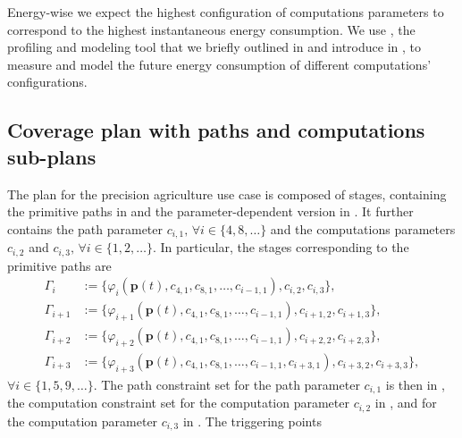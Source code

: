 Energy-wise we expect the highest configuration of computations parameters to correspond to the highest instantaneous energy consumption. We use \powprof{}, the profiling and modeling tool that we briefly outlined in  and introduce in , to measure and model the future energy consumption of different computations' configurations.

\subsection{Coverage plan with paths and computations sub-plans}

The plan for the precision agriculture use case is composed of stages, containing the primitive paths in  and the parameter-dependent version in . It further contains the path parameter $c_{i,1},\,\forall i\in\{4,8,\dots\}$ and the computations parameters $c_{i,2}$ and $c_{i,3},\,\forall i\in\{1,2,\dots\}$. In particular, the stages corresponding to the primitive paths are 
\begin{subequations}\label{eq:ex-pb-stages}\begin{align}
  \Gamma_i&:=\{\varphi_i(\mathbf{p}(t),c_{4,1},c_{8,1},\dots,c_{i-1,1}),c_{i,2},c_{i,3}\},\label{eq:line-plan}\\
  \Gamma_{i+1}&:=\{\varphi_{i+1}(\mathbf{p}(t),c_{4,1},c_{8,1},\dots,c_{i-1,1}),c_{i+1,2},c_{i+1,3}\},\label{eq:circ-plan}\\
  \Gamma_{i+2}&:=\{\varphi_{i+2}(\mathbf{p}(t),c_{4,1},c_{8,1},\dots,c_{i-1,1}),c_{i+2,2},c_{i+2,3}\},\label{eq:line2-plan}\\
  \Gamma_{i+3}&:=\{\varphi_{i+3}(\mathbf{p}(t),c_{4,1},c_{8,1},\dots,c_{i-1,1},c_{i+3,1}),c_{i+3,2},c_{i+3,3}\},\label{eq:circ2-plan}
\end{align}
\end{subequations}
$\forall i\in\{1,5,9,\dots\}$. The path constraint set for the path parameter $c_{i,1}$ is then in , the computation constraint set for the computation parameter $c_{i,2}$ in , and for the computation parameter $c_{i,3}$ in . The triggering points
